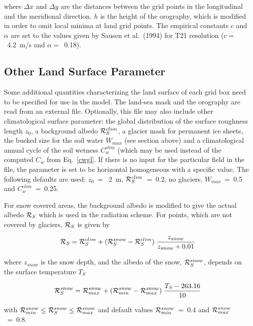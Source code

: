 where $\Delta x$ and $\Delta y$ are the distances
between the grid points in the longitudinal
and the meridional direction. $h$ is the height of the
orography, which is modified in
order to omit local minima at land grid points. The
empirical constants $c$ and $\alpha$ are
set to the values given by Sausen et al.~(1994) for T21
resolution ($c = $~4.2~m/s and
$\alpha =$~0.18).  

\subsection{Other Land Surface
Parameter}\label{landsurf}

Some additional quantities characterizing the land surface of
each grid box need to be specified for use in the model. The land-sea mask and the orography
are read from an external file. Optionally, this file may also include other climatological surface
parameter: the global distribution of the surface roughness length $z_0$, a background albedo
${\cal R}_S^{clim}$, a glacier mask for permanent ice sheets, the bucked size for the soil water
$W_{max}$ (see section above) and a climatological annual cycle of the soil wetness
$C^{clim}_w$ (which may be used instead of the computed $C_w$ from Eq.~\ref{cwgl}. If
there is no input for the particular field in the file, the parameter is set to be horizontal
homogeneous with a specific value. The following defaults are used: $z_0$~=~ 2~m,
 ${\cal R}_S^{clim}$~=~0.2, no glaciers, $W_{max}$~=~0.5 and $C^{clim}_w$~=~0.25. 

For snow covered areas, the background albedo is modified to give the actual albedo ${\cal
R}_S$
which is used in the radiation scheme. For points, which are not covered by glaciers, ${\cal
R}_S$ is
given by

\begin{equation}
{\cal R}_S={\cal R}_S^{clim} + ({\cal R}_S^{snow}-{\cal R}_S^{clim}) \;
\frac{z_{snow}}{z_{snow} + 0.01}   
\end{equation} 

where $z_{snow}$ is the snow depth, and the albedo of the snow, ${\cal R}_S^{snow}$,
depends on
the surface temperature $T_S$

\begin{equation}\label{rsnow}
{\cal R}_S^{snow}={\cal R}_{max}^{snow} + ({\cal R}_{min}^{snow} - {\cal 
R}_{max}^{snow}) \; \frac{T_S -
263.16}{10}
\end{equation}

with ${\cal R}_{min}^{snow} \le {\cal R}_S^{snow} \le {\cal R}_{max}^{snow}$ and default
values
${\cal R}_{min}^{snow}$~=~0.4 and ${\cal R}_{max}^{snow}$~=~0.8.


